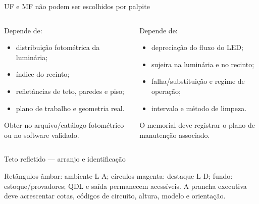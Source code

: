 \begin{frame}{UF e MF não podem ser escolhidos por palpite}
\small
\begin{columns}[T,onlytextwidth]
\begin{caixaNorma}[title=Fator de utilização — UF]
Depende de:
\begin{itemize}
\item distribuição fotométrica da luminária;
\item índice do recinto;
\item refletâncias de teto, paredes e piso;
\item plano de trabalho e geometria real.
\end{itemize}
Obter no arquivo/catálogo fotométrico ou no software validado.
\end{caixaNorma}
\begin{caixaNorma}[title=Fator de manutenção — MF]
Depende de:
\begin{itemize}
\item depreciação do fluxo do LED;
\item sujeira na luminária e no recinto;
\item falha/substituição e regime de operação;
\item intervalo e método de limpeza.
\end{itemize}
O memorial deve registrar o plano de manutenção associado.
\end{caixaNorma}
\end{columns}
\end{frame}

\begin{frame}{Teto refletido — arranjo e identificação}
\centering
{}
\vspace{0.5mm}
\scriptsize Retângulos âmbar: ambiente L-A; círculos magenta: destaque L-D; fundo: estoque/provadores; QDL e saída permanecem acessíveis. A prancha executiva deve acrescentar cotas, códigos de circuito, altura, modelo e orientação.
\end{frame}

